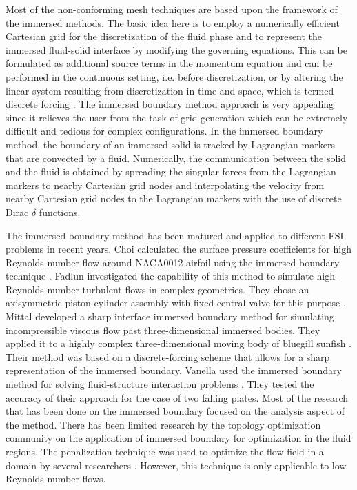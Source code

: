 \documentclass[12pt]{aiaa-pretty}
\begin{document}
Most of the non-conforming mesh techniques are based upon the framework of the immersed methods. The basic idea here is to employ a numerically efficient Cartesian grid for the discretization of the fluid phase and to represent the immersed fluid-solid interface by modifying the governing equations. This can be formulated as additional source terms in the momentum equation and can be performed in the continuous setting, i.e. before discretization, or by altering the linear system resulting from discretization in time and space, which is termed discrete forcing \cite{mittal2005immersed}. The immersed boundary method approach is very appealing since it relieves the user from the task of grid generation which can be extremely difficult and tedious for complex configurations. In the immersed boundary method, the boundary of an immersed solid is tracked by Lagrangian markers that are convected by a fluid. Numerically, the communication between the solid and the fluid is obtained by spreading the singular forces from the Lagrangian markers to nearby Cartesian grid nodes and interpolating the velocity from nearby Cartesian grid nodes to the Lagrangian markers with the use of discrete Dirac $\delta$ functions.

The immersed boundary method has been matured and applied to different FSI problems in recent years. Choi calculated the surface pressure coefficients for high Reynolds number flow around NACA0012 airfoil using the immersed boundary technique \cite{choi2007immersed}. Fadlun investigated the capability of this method to simulate high-Reynolds number turbulent flows in complex geometries. They chose an axisymmetric piston-cylinder assembly with fixed central valve for this purpose \cite{fadlun2000combined}. Mittal developed a sharp interface immersed boundary method for simulating incompressible viscous flow past three-dimensional immersed bodies. They applied it to a highly complex three-dimensional moving body of bluegill sunfish \cite{mittal2008versatile}. Their method was based on a discrete-forcing scheme that allows for a sharp representation of the immersed boundary. Vanella used the immersed boundary method for solving fluid-structure interaction problems \cite{vanella2010direct}. They tested the accuracy of their approach for the case of two falling plates. Most of the research that has been done on the immersed boundary focused on the analysis aspect of the method. There has been limited research by the topology optimization community on the application of immersed boundary for optimization in the fluid regions. The penalization technique was used to optimize the flow field in a domain by several researchers \cite{challis2009level, pingen2010parametric, kreissl2012levelset}. However, this technique is only applicable to low Reynolds number flows.
\end{document}
